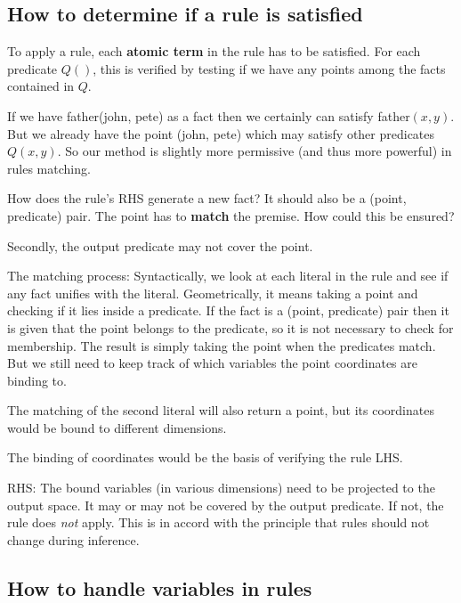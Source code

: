 \subsection{How to determine if a rule is satisfied}

To apply a rule, each \textbf{atomic term} in the rule has to be satisfied.  For each predicate $Q()$, this is verified by testing if we have any points among the facts contained in $Q$.

If we have \textsf{father(john, pete)} as a fact then we certainly can satisfy \textsf{father}$(x,y)$.  But we already have the point \textsf{(john, pete)} which may satisfy other predicates $Q(x,y)$.  So our method is slightly more permissive (and thus more powerful) in rules matching.

How does the rule's RHS generate a new fact?  It should also be a (point, predicate) pair.  The point has to \textbf{match} the premise.  How could this be ensured?

Secondly, the output predicate may not cover the point.

The matching process:  Syntactically, we look at each literal in the rule and see if any fact unifies with the literal.  Geometrically, it means taking a point and checking if it lies inside a predicate.  If the fact is a (point, predicate) pair then it is given that the point belongs to the predicate, so it is not necessary to check for membership.  The result is simply taking the point when the predicates match.  But we still need to keep track of which variables the point coordinates are binding to.

The matching of the second literal will also return a point, but its coordinates would be bound to different dimensions.  

The binding of coordinates would be the basis of verifying the rule LHS.

RHS:  The bound variables (in various dimensions) need to be projected to the output space.  It may or may not be covered by the output predicate.  If not, the rule does \textit{not} apply.  This is in accord with the principle that rules should not change during inference.

\subsection{How to handle variables in rules}



